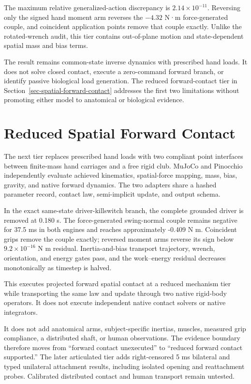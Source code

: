 \documentclass[
  letterpaper,
]{report}
\begin{document}
The maximum relative generalized-action discrepancy is
\(2.14\times10^{-11}\). Reversing only the signed hand moment arm
reverses the \(-4.32\) N·m force-generated couple, and coincident
application points remove that couple exactly. Unlike the rotated-wrench
audit, this tier contains out-of-plane motion and state-dependent
spatial mass and bias terms.

The result remains common-state inverse dynamics with prescribed hand
loads. It does not solve closed contact, execute a zero-command forward
branch, or identify passive biological load generation. The reduced
forward-contact tier in Section~\ref{sec-spatial-forward-contact}
addresses the first two limitations without promoting either model to
anatomical or biological evidence.

\section{Reduced Spatial Forward
Contact}\label{sec-ladder-spatial-forward-contact}

The next tier replaces prescribed hand loads with two compliant point
interfaces between finite-mass hand carriages and a free rigid club.
MuJoCo and Pinocchio independently evaluate achieved kinematics,
spatial-force mapping, mass, bias, gravity, and native forward dynamics.
The two adapters share a hashed parameter record, contact law,
semi-implicit update, and output schema.

In the exact same-state driver-killswitch branch, the complete grounded
driver is removed at 0.180 s. The force-generated swing-normal couple
remains negative for 37.5 ms in both engines and reaches approximately
-0.409 N m. Coincident grips remove the couple exactly; reversed moment
arms reverse its sign below \(9.2\times10^{-16}\) N m residual.
Inertia-and-bias transport trajectory, wrench, orientation, and energy
gates pass, and the work--energy residual decreases monotonically as
timestep is halved.

This executes projected forward spatial contact at a reduced mechanism
tier while transporting the same law and update through two native
rigid-body operators. It does not execute independent native contact
solvers or native integrators.

It does not add anatomical arms, subject-specific inertias, muscles,
measured grip compliance, a distributed shaft, or human observations.
The evidence boundary therefore moves from ``forward contact
unexecuted'' to ``reduced forward contact supported.'' The later
articulated tier adds right-censored 5 ms bilateral and typed unilateral
attachment results, including isolated opening and reattachment probes.
Calibrated distributed contact and human transport remain untested.
\end{document}
